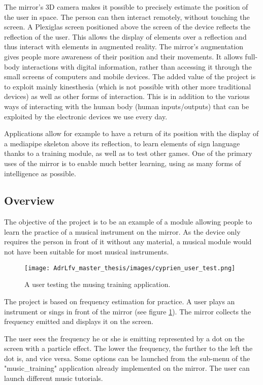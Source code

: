 The mirror’s 3D camera makes it possible to precisely estimate the position of the user in  space. The person can then interact remotely, without touching the screen. A Plexiglas screen positioned above the screen of the device reflects the reflection of the user. This allows the display of elements over a reflection and thus interact with elements in augmented reality. The mirror’s augmentation gives people more awareness of their position and their movements. It allows full-body interactions with digital information, rather than accessing it through the small screens of computers and mobile devices. The added value of the project is to exploit mainly kinesthesia (which is not possible with other more traditional devices) as well as other forms of interaction. This is in addition to the various ways of interacting with the human body (human inputs/outputs) that can be exploited by the electronic devices we use every day.

Applications allow for example to have a return of its position with the display of a mediapipe skeleton above its reflection, to learn elements of sign language thanks to a training module, as well as to test other games. One of the primary uses of the mirror is to enable much better learning, using as many forms of intelligence as possible.

\subsection{Overview}

The objective of the project is to be an example of a module allowing people to learn the practice of a musical instrument on the mirror. As the device only requires the person in front of it without any material, a musical module would not have been suitable for most musical instruments.

\begin{figure}[h]
    \centering
    \texttt{[image: AdrLfv\_master\_thesis/images/cyprien\_user\_test.png]}
    \caption{A user testing the musing training application.}
    \label{fig:cyprien_user_test}
\end{figure}

The project is based on frequency estimation for practice. A user plays an instrument or sings in front of the mirror (see figure \ref{fig:cyprien_user_test}). The mirror collects the frequency emitted and displays it on the screen.

The user sees the frequency he or she is emitting represented by a dot on the screen with a particle effect. The lower the frequency, the further to the left the dot is, and vice versa. Some options can be launched from the sub-menu of the "music\_training" application already
implemented on the mirror. The user can launch different music tutorials.

